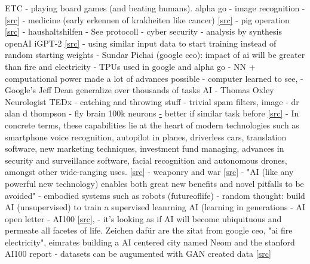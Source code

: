 ETC 
 - playing board games (and beating humans). alpha go 
 - image recognition
 - \href{https://pubs.rsc.org/en/content/articlehtml/2019/sc/c9sc01742a}{[src]}
 - medicine (early erkennen of krakheiten like cancer) \href{https://med.stanford.edu/radiology/news/2020/smart-toilet.html}{[src]}
 - pig operation \href{https://www.science.org/doi/10.1126/scirobotics.abj2908}{[src]}
 - haushaltshilfen 
 - See protocoll
 - cyber security\cite{Sarker2021}
 - analysis by synthesis openAI iGPT-2 \href{https://openai.com/blog/image-gpt/}{[src]}
 - using similar input data to start training instead of random starting weights
 - Sundar Pichai (google ceo): impact of ai will be greater than fire and electricity
 - TPUs used in google and alpha go 
 - NN + computational power made a lot of advances possible
 - computer learned to see, 
 - Google's Jeff Dean generalize over thousands of tasks AI
 - Thomas Oxley Neurologist TEDx
 - catching and throwing stuff 
 - trivial spam filters, image
 - dr alan d thompson
 - fly brain 100k neurons \cite{Zheng2018} \href{https://en.wikipedia.org/wiki/List\_of\_animals\_by\_number\_of\_neurons{[wiki]}}
 - better if similar task before \href{https://www.cs.ubc.ca/~amuham01/LING530/papers/radford2018improving.pdf}{[src]}
 - In concrete terms, these capabilities lie at the heart of modern technologies such as smartphone voice recognition, autopilot in planes, driverless cars, translation software, new marketing techniques, investment fund managing, advances in security and surveillance software, facial recognition and autonomous drones, amongst other wide-ranging uses.
 \href{https://onlinelibrary.wiley.com/doi/full/10.1111/1467-923X.12794}{[src]}\cite{Hassan2020}
 - weaponry and war \href{https://futureoflife.org/data/documents/research\_priorities.pdf}{[src]}
 - "AI (like any powerful new technology) enables both great new benefits
 and novel pitfalls to be avoided"
 - embodied systems such as robots (futureoflife)
 - random thought: build AI (unsupervised) to train a supervised leanrning AI (learning in generations
 - AI open letter \cite{Russel2015}
 - AI100 \href{https://ai100.stanford.edu/gathering-strength-gathering-storms-one-hundred-year-study-artificial-intelligence-ai100-2021-study}{[src]}, 
 - it's looking as if AI will become ubiquituous and permeate all facetes of life. Zeichen dafür are the  zitat from google ceo, "ai fire electricity", eimrates building a AI centered city named Neom and the stanford AI100 report \cite{Littman2021}
 - datasets can be augumented with GAN created data [\href{https://arxiv.org/abs/1711.04340}{src}]
